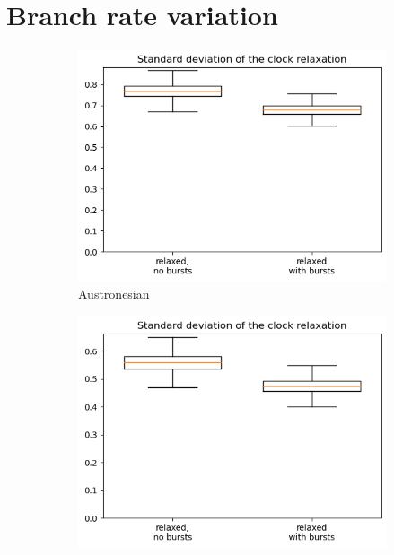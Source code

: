 \documentclass[a4paper]{article}
\begin{document}
\newpage
\section{Branch rate variation}

\begin{figure}[h]
  \centering
  \begin{subfigure}{0.4\textwidth}
    \includegraphics[width=\textwidth]{supplement/analysis/austronesian_clockrates.png}
    \caption{Austronesian}
    \label{fig:rate_variation:austronesian}
  \end{subfigure}
  \begin{subfigure}{0.4\textwidth}
    \includegraphics[width=\textwidth]{supplement/analysis/bantu_clockrates.png}

\end{subfigure}
\end{figure}
\end{document}
